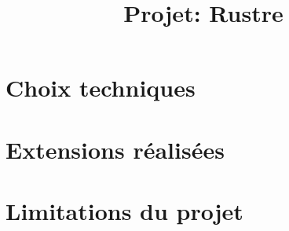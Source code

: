 \documentclass[11pt]{article}
\author{}
\title{Projet: Rustre}
\date{}
\begin{document}
\maketitle

\section{Choix techniques}
\section{Extensions réalisées}
\section{Limitations du projet}
\end{document}
